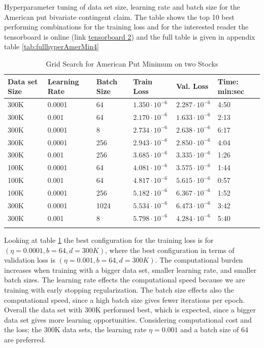 \begin{table}[th]
\caption{Grid Search for American Put Minimum on two Stocks}{Hyperparameter tuning of data set size, learning rate and batch size for the American put bivariate contingent claim. The table shows the top 10 best performing combinations for the training loss and for the interested reader the tensorboard is online (link \href{https://tensorboard.dev/experiment/ECWCP8nPTJWoXKVdBcQSaw/#scalars}{tensorboard 2}) and the full table is given in appendix table \ref{tab:fullhyperAmerMin4}}
\label{tab:hyperAmerMin1}
\centering
\begin{tabular}{llllll}
\toprule
\textbf{Data set Size} & \textbf{Learning Rate} & \textbf{Batch Size} & \textbf{Train Loss} & \textbf{Val. Loss} & \textbf{Time: min:sec} \\
\midrule
300K     & 0.0001 & 64    & $1.350 \cdot 10^{-6}$   & $2.287 \cdot 10^{-6}$ & 4:50 \\ 
300K     & 0.001 & 64     & $2.170 \cdot 10^{-6}$   & $1.633 \cdot 10^{-6}$ & 2:13 \\ 
300K     & 0.0001 & 8     & $2.734 \cdot 10^{-6}$   & $2.638 \cdot 10^{-6}$ & 6:17\\ 
300K     & 0.0001 & 256   & $2.943 \cdot 10^{-6}$   & $2.850 \cdot 10^{-6}$ & 4:04\\ 
300K     & 0.001 & 256    & $3.685 \cdot 10^{-6}$   & $3.335 \cdot 10^{-6}$ & 1:26\\ 
100K     & 0.0001 & 64    & $4.081 \cdot 10^{-6}$   & $3.575 \cdot 10^{-6}$ & 1:44\\ 
100K     & 0.001 & 64     & $4.817 \cdot 10^{-6}$   & $5.615 \cdot 10^{-6}$ & 0:57\\ 
100K     & 0.0001 & 256   & $5.182 \cdot 10^{-6}$   & $6.367 \cdot 10^{-6}$ & 1:52\\ 
300K     & 0.0001 & 1024  & $5.534 \cdot 10^{-6}$   & $6.473 \cdot 10^{-6}$ & 3:42\\ 
300K     & 0.001 & 8      & $5.798 \cdot 10^{-6}$   & $4.284 \cdot 10^{-6}$ & 5:40\\ 
\bottomrule\\
\end{tabular}
\end{table}

Looking at table \ref{tab:hyperAmerMin1} the best configuration for the training loss is for $(\eta=0.0001, b=64, d=300K)$, where the best configuration in terms of validation loss is $(\eta=0.001, b=64, d=300K)$. The computational burden increases when training with a bigger data set, smaller learning rate, and smaller batch sizes. The learning rate effects the computational speed because we are training with early stopping regularization. The batch size effects also the computational speed, since a high batch size gives fewer iterations per epoch. Overall the data set with 300K performed best, which is expected, since a bigger data set gives more learning opportunities. Considering computational cost and the loss; the 300K data sets, the learning rate $\eta=0.001$ and a batch size of 64 are preferred.\\

